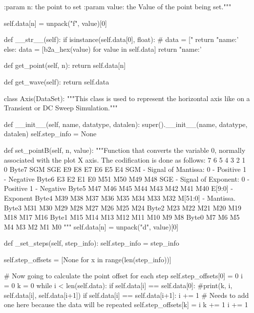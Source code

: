         :param n:     the point to set
        :param value: the Value of the point being set."""

        self.data[n] = unpack("f", value)[0]

    def __str__(self):
        if isinstance(self.data[0], float):
            # data = ["%
            return "name:'%
        else:
            data = [b2a_hex(value) for value in self.data]
            return "name:'%

    def get_point(self, n):
        return self.data[n]

    def get_wave(self):
        return self.data


class Axis(DataSet):
    """This class is used to represent the horizontal axis like on a Transient or DC Sweep Simulation."""

    def __init__(self, name, datatype, datalen):
        super().__init__(name, datatype, datalen)
        self.step_info = None

    def set_pointB(self, n, value):
        """Function that converts the variable 0, normally associated with the plot X axis.
        The codification is done as follows:
               7   6   5   4     3   2   1   0
        Byte7  SGM SGE E9  E8    E7  E6  E5  E4         SGM - Signal of Mantissa: 0 - Positive 1 - Negative
        Byte6  E3  E2  E1  E0    M51 M50 M49 M48        SGE - Signal of Exponent: 0 - Positive 1 - Negative
        Byte5  M47 M46 M45 M44   M43 M42 M41 M40        E[9:0] - Exponent
        Byte4  M39 M38 M37 M36   M35 M34 M33 M32        M[51:0] - Mantissa.
        Byte3  M31 M30 M29 M28   M27 M26 M25 M24
        Byte2  M23 M22 M21 M20   M19 M18 M17 M16
        Byte1  M15 M14 M13 M12   M11 M10 M9  M8
        Byte0  M7  M6  M5  M4    M3  M2  M1  M0
        """
        self.data[n] = unpack("d", value)[0]


    def _set_steps(self, step_info):
        self.step_info = step_info

        self.step_offsets = [None for x in range(len(step_info))]

        # Now going to calculate the point offset for each step
        self.step_offsets[0] = 0
        i = 0
        k = 0
        while i < len(self.data):
            if self.data[i] == self.data[0]:
                #print(k, i, self.data[i], self.data[i+1])
                if self.data[i] == self.data[i+1]:
                    i += 1  # Needs to add one here because the data will be repeated
                self.step_offsets[k] = i
                k += 1
            i += 1

